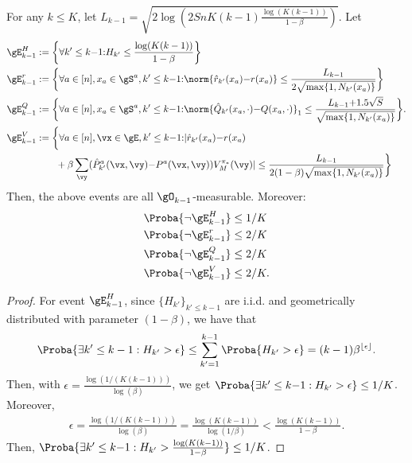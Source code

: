 \begin{subappendices}
\begin{lem}
    \label{lem:concentration}
    For any $k\le K$, let $L_{k-1}=\sqrt{2\log\left(2SnK(k-1)\frac{\log(K(k-1))}{1-\beta}\right)}$. Let
    \begin{align}
        \gE_{k-1}^H&:= \bigg\{\forall k'\le k{-}1{:} H_{k'}\le \frac{\log(K(k-1))}{1-\beta}\bigg\} \label{eq:conc_h}\\
        \gE_{k-1}^r&:= \bigg\{\forall a\in[n], x_a\in\gS^a, k'\le k{-}1{:} \norm{\hat{r}_{k'}(x_a){-}r(x_a)} \le \frac{L_{k-1}}{2\sqrt{\max\{1,N_{k'}(x_a)\}}}\bigg\} \label{eq:conc_r} \\
        \gE_{k-1}^Q&:= \bigg\{\forall a\in[n], x_a\in\gS^a, k'\le k{-}1{:} \norm{\hat{Q}_{k'}(x_a,\cdot){-}Q(x_a, \cdot)}_1 \le \frac{L_{k-1}{+}1.5\sqrt{S}}{\sqrt{\max\{1,N_{k'}(x_a)\}}}\bigg\}. \label{eq:conc_q} \\
        \gE_{k-1}^V&:= \bigg\{\forall a\in[n], \vx\in\gE, k'\le k{-}1{:} |\hat{r}_{k'}(x_a){-}r(x_a) \nonumber \\
                   &\qquad +\beta \sum_{\vy}(\hat{P}_{k'}^a(\vx,\vy) {-}P^a(\vx,\vy))V_M^{\pi_*}(\vy)|
        \le \frac{L_{k-1}}{2(1-\beta)\sqrt{\max\{1,N_{k'}(x_a)\}}}\bigg\} \label{eq:conc_V}
    \end{align}
    Then, the above events are all $\gO_{k-1}$-measurable. Moreover:
    \begin{align*}
        &\Proba{\lnot\gE_{k-1}^H}\le1/K \\ 
        &\Proba{\lnot \gE_{k-1}^r }\le 2/K \\
        &\Proba{\lnot \gE_{k-1}^Q }\le 2/K \\
        &\Proba{\lnot \gE_{k-1}^V }\le 2/K.
    \end{align*} 
\end{lem}

\begin{proof}
    For event $\gE_{k-1}^H$, since $\{H_{k'}\}_{k'\le k{-}1}$ are i.i.d. and geometrically distributed with parameter $(1-\beta)$, we have that
    \begin{align*}
        \Proba{\exists k'\le k-1: H_{k'}>\epsilon} \le \sum_{k'=1}^{k-1} \Proba{H_{k'}>\epsilon} =(k-1)\beta^{\lfloor \epsilon\rfloor}.
    \end{align*}
    Then, with $\epsilon=\frac{\log(1/(K(k-1)))}{\log(\beta)}$, we get $\Proba{\exists k'\le k{-}1: H_{k'}>\epsilon}\le 1/K$.
    Moreover,
    \begin{align*}
        \epsilon = \frac{\log(1/(K(k-1)))}{\log(\beta)}= \frac{\log(K(k-1))}{\log(1/\beta)} < \frac{\log(K(k-1))}{1-\beta}.
    \end{align*}
    Then, $\Proba{\exists k'\le k{-}1: H_{k'}>\frac{\log(K(k-1))}{1-\beta}}\le 1/K$.


\end{proof}
\end{subappendices}
